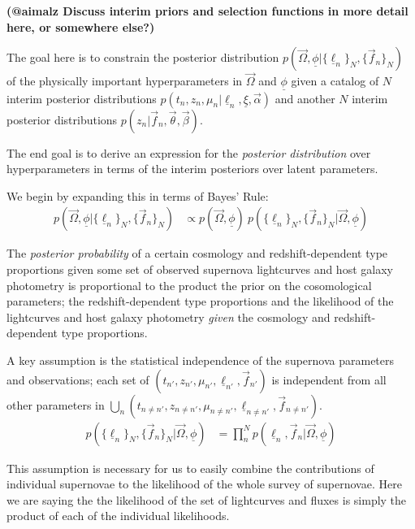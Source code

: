 \documentclass[12pt, onecolumn]{emulateapj}
\newcommand{\textul}{\underline}
\begin{document}
\textbf{(@aimalz Discuss interim priors and selection functions in more detail here, or somewhere else?)}

The goal here is to constrain the posterior distribution $p(\vec{\Omega}, \textul{\phi} | \{\textul{\ell}_{n}\}_{N}, \{\vec{f}_{n}\}_{N})$ of the physically important hyperparameters in $\vec{\Omega}$ and $\textul{\phi}$ given a catalog of $N$ interim posterior distributions $p(t_{n}, z_{n}, \mu_{n} | \textul{\ell}_{n}, \textul{\xi}, \vec{\alpha})$ and another $N$ interim posterior distributions $p(z_{n} | \vec{f}_{n}, \vec{\theta}, \vec{\beta})$.  

The end goal is to derive an expression for the \textit{posterior distribution} over hyperparameters in terms of the interim posteriors over latent parameters.

We begin by expanding this in terms of Bayes' Rule:
\begin{align}
\label{eq:bayes}
p(\vec{\Omega}, \textul{\phi} | \{\textul{\ell}_{n}\}_{N}, \{\vec{f}_{n}\}_{N}) &\propto p(\vec{\Omega}, \textul{\phi})\ p(\{\textul{\ell}_{n}\}_{N}, \{\vec{f}_{n}\}_{N} | \vec{\Omega}, \textul{\phi})
\end{align}

The \textit{posterior probability} of a certain cosmology and redshift-dependent type proportions given some set of observed supernova lightcurves and host galaxy photometry is proportional to the product the prior on the cosomological parameters; the redshift-dependent type proportions and the likelihood of the lightcurves and host galaxy photometry \textit{given} the cosmology and redshift-dependent type proportions.

A key assumption is the statistical independence of the supernova parameters and observations; each set of $(t_{n'}, z_{n'}, \mu_{n'}, \textul{\ell}_{n'}, \vec{f}_{n'})$ is independent from all other parameters in $\bigcup_{n}(t_{n\neq n'}, z_{n\neq n'}, \mu_{n\neq n'}, \textul{\ell}_{n\neq n'}, \vec{f}_{n\neq n'})$.
\begin{align}
\label{eq:independence}
p(\{\textul{\ell}_{n}\}_{N}, \{\vec{f}_{n}\}_{N} | \vec{\Omega}, \textul{\phi}) &= \prod_{n}^{N}p(\textul{\ell}_{n}, \vec{f}_{n} | \vec{\Omega}, \textul{\phi})
\end{align}

This assumption is necessary for us to easily combine the contributions of individual supernovae to the likelihood of the whole survey of supernovae. Here we are saying the the likelihood of the set of lightcurves and fluxes is simply the product of each of the individual likelihoods.
\end{document}
